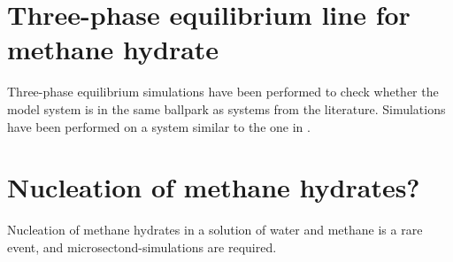 \section{Three-phase equilibrium line for methane hydrate}
Three-phase equilibrium simulations have been performed to check whether the model system is in the same ballpark as systems from the literature. Simulations have been performed on a system similar to the one in \cite{Conde2010}.

\section{Nucleation of methane hydrates?}
Nucleation of methane hydrates in a solution of water and methane is a rare event, and microsectond-simulations are required. 
